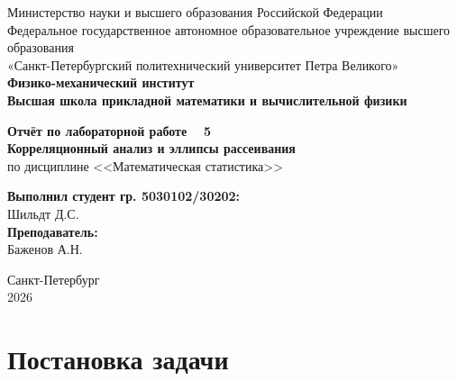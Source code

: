 \documentclass[a4paper, 14pt]{extarticle}
\begin{document}
\begin{titlepage}
    \begin{center}
        Министерство науки и высшего образования Российской Федерации\\
        Федеральное государственное автономное образовательное учреждение высшего образования\\
        «Санкт-Петербургский политехнический университет Петра Великого»\\
        
        \textbf{Физико-механический институт}\\
        \textbf{Высшая школа прикладной математики и вычислительной физики}
    \end{center}

    \vfill
    
    \begin{center}
        \textbf{Отчёт по лабораторной работе \textnumero~ 5\\[0.5cm]}
        \textbf{Корреляционный анализ и эллипсы рассеивания\\}
        по дисциплине <<Математическая статистика>>
    \end{center}

    \vfill

    \hfill
    \begin{minipage}{0.45\textwidth}
        \textbf{Выполнил студент гр. 5030102/30202:}\\
        Шильдт Д.С.\\[0.5cm]
        \textbf{Преподаватель:}\\ 
        Баженов А.Н.
    \end{minipage}

    \vfill

    \begin{center}
        Санкт-Петербург\\2026
    \end{center}
\end{titlepage}

\setcounter{page}{2}

\tableofcontents
\newpage

\section{Постановка задачи}
\end{document}
